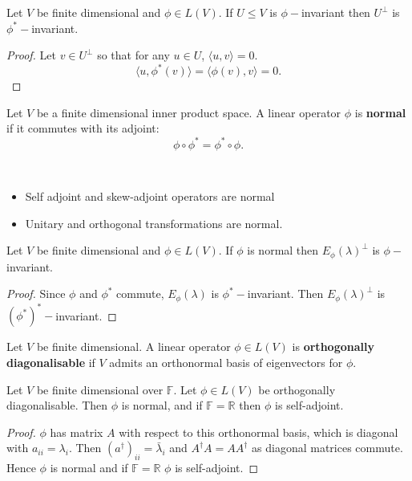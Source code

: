 \begin{lemma}
  Let $V$ be finite dimensional and $\phi \in L(V)$. If $U \leq V$ is $\phi-$invariant then $U^\perp$ is $\phi^*-$invariant.
\end{lemma}
\begin{proof}
    Let $v \in U^\perp$ so that for any $u \in U$, $\langle u, v \rangle = 0$.
    \[\langle u, \phi^*(v) \rangle = \langle \phi(v), v \rangle = 0.\]
\end{proof}

\begin{definition}
  Let $V$ be a finite dimensional inner product space. A linear operator $\phi$ is {\bf normal} if it commutes with its adjoint:
  \[\phi \circ \phi^* = \phi^* \circ \phi.\]
\end{definition}

\begin{example} $ $

    \begin{itemize}
      \item Self adjoint and skew-adjoint operators are normal
      \item Unitary and orthogonal transformations are normal.
    \end{itemize}
\end{example}

\begin{prop}
    Let $V$ be finite dimensional and $\phi \in L(V)$. If $\phi$ is normal then $E_\phi(\lambda)^\perp$ is $\phi-$invariant.
\end{prop}
\begin{proof}
    Since $\phi$ and $\phi^*$ commute, $E_\phi(\lambda)$ is $\phi^*-$invariant. Then $E_\phi(\lambda)^\perp$ is $(\phi^*)^*-$invariant.
\end{proof}

\begin{definition}
Let $V$ be finite dimensional. A linear operator $\phi \in L(V)$ is {\bf orthogonally diagonalisable} if $V$ admits an orthonormal basis of eigenvectors for $\phi$.
\end{definition}

\begin{prop}
    Let $V$ be finite dimensional over $\mathbb{F}$. Let $\phi \in L(V)$ be orthogonally diagonalisable. Then $\phi$ is normal, and if $\mathbb{F} = \mathbb{R}$ then $\phi$ is self-adjoint.
\end{prop}
\begin{proof}
  $\phi$ has matrix $A$ with respect to this orthonormal basis, which is diagonal with $a_{ii} = \lambda_i$. Then $(a^\dag)_{ii} = \bar{\lambda}_i$ and $A^\dag A = A A^\dag$ as diagonal matrices commute. Hence $\phi$ is normal and if $\mathbb{F} = \mathbb{R}$ $\phi$ is self-adjoint.
\end{proof}

